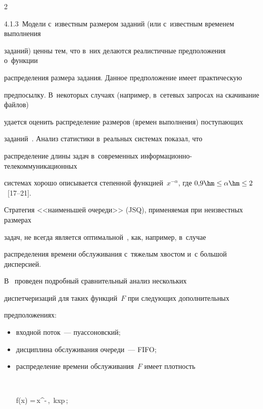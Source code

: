 \begin{multicols}{2}
    


    \smallskip


    


    4.1.3\ Модели с~известным размером заданий (или с~известным временем выполнения 


заданий) ценны тем, что в~них делаются реалистичные предположения о~функции 


распределения размера задания. Данное предположение имеет практическую 


предпосылку. В~некоторых случаях (например, в~сетевых запросах на скачивание файлов) 


удается оценить распределение размеров (времен выполнения) поступающих 


заданий~\cite{19-kon}. Анализ статистики в~реальных сис\-те\-мах показал, что 


распределение длины задач в~современных информационно-те\-ле\-ком\-му\-ни\-ка\-ци\-он\-ных 


системах хорошо описывается степенной функцией~$x^{-\alpha}$, где $0{,}9\hm\leq 


\alpha \hm \leq 2$~[17--21].


    


    Стратегия <<наименьшей очереди>> (JSQ), применяемая при неизвестных размерах 


задач, не всегда является оптимальной~\cite{23-kon}, как, например, в~случае 


распределения времени обслуживания с~тяжелым хвостом и~с большой дисперсией. 


В~\cite{19-kon, 24-kon} проведен подробный сравнительный анализ нескольких 


диспетчеризаций для таких функций~$F$ при следующих дополнительных 


предположениях:


    \begin{itemize}


    \item  входной поток~--- пуассоновский;


    \item  дисциплина обслуживания очереди~--- FIFO;


    \item  распределение времени обслуживания~$F$ имеет плотность


    $$


    f(x) =\,x^{-}\,,\ k\leq x\leq p\,;



\end{itemize}
\end{multicols}
